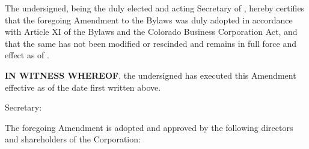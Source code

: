 \bigskip


\noindent The undersigned, being the duly elected and acting Secretary of \companyName, hereby
certifies that the foregoing Amendment to the Bylaws was duly adopted in accordance with
Article XI of the Bylaws and the Colorado Business Corporation Act, and that the same has not
been modified or rescinded and remains in full force and effect as of \effectiveDate.

\bigskip
\noindent \textbf{IN WITNESS WHEREOF}, the undersigned has executed this Amendment effective as
of the date first written above.

\bigskip
\noindent Secretary:

\sigblock{\secretaryName}

\bigskip
\noindent The foregoing Amendment is adopted and approved by the following directors and
shareholders of the Corporation:

\sigpair{\directorOne}{\directorTwo}
\sigpair{\directorThree}{\directorFour}
\sigpair{\directorFive}{\directorSix}
